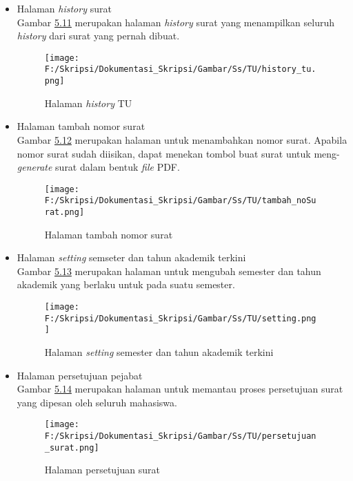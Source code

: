 \begin{itemize}
	\item Halaman \textit{history} surat\\
	 Gambar \hyperlink{halaman_history_tu}{5.11} merupakan halaman \textit{history} surat yang menampilkan seluruh \textit{history} dari surat yang pernah dibuat.
	 \begin{figure}[H]
	\centering
		\texttt{[image: F:/Skripsi/Dokumentasi\_Skripsi/Gambar/Ss/TU/history\_tu.png]}
		\caption{Halaman \textit{history} TU}
		\label{fig:halaman_history_tu}
	\end{figure}
	
	\item Halaman tambah nomor surat\\
	 Gambar \hyperlink{halaman_tambah_nomor_surat}{5.12} merupakan halaman untuk menambahkan nomor surat. Apabila nomor surat sudah diisikan, dapat menekan tombol buat surat untuk meng-\textit{generate} surat dalam bentuk \textit{file} PDF.
	 \begin{figure}[H]
	\centering
		\texttt{[image: F:/Skripsi/Dokumentasi\_Skripsi/Gambar/Ss/TU/tambah\_noSurat.png]}
		\caption{Halaman tambah nomor surat}
		\label{fig:halaman_tambah_nomor_surat}
	\end{figure}
	
	\item Halaman \textit{setting} semseter dan tahun akademik terkini\\
	 Gambar \hyperlink{halaman_setting_semester_dan_tahun_akademik_terkini}{5.13} merupakan halaman untuk mengubah semester dan tahun akademik yang berlaku untuk pada suatu semester.
	 \begin{figure}[H]
	\centering
		\texttt{[image: F:/Skripsi/Dokumentasi\_Skripsi/Gambar/Ss/TU/setting.png]}
		\caption{Halaman \textit{setting} semester dan tahun akademik terkini}
		\label{fig:halaman_setting_semester_dan_tahun_akademik_terkini}
	\end{figure}
	
	\item Halaman persetujuan pejabat\\
	 Gambar \hyperlink{halaman_persetujuan_pejabat}{5.14} merupakan halaman untuk memantau proses persetujuan surat yang dipesan oleh seluruh mahasiswa.
	 \begin{figure}[H]
	\centering
		\texttt{[image: F:/Skripsi/Dokumentasi\_Skripsi/Gambar/Ss/TU/persetujuan\_surat.png]}
		\caption{Halaman persetujuan surat}
		\label{fig:halaman_persetujuan_pejabat}
	\end{figure}
\end{itemize}
	
